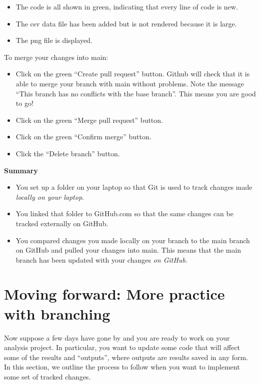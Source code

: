 \documentclass[
]{book}
\providecommand{\tightlist}{%
  \setlength{\itemsep}{0pt}\setlength{\parskip}{0pt}}
\begin{document}
\begin{itemize}
\tightlist
\item
  The code is all shown in green, indicating that every line of code is new.
\item
  The csv data file has been added but is not rendered because it is large.
\item
  The png file is displayed.
\end{itemize}

To merge your changes into main:

\begin{itemize}
\tightlist
\item
  Click on the green ``Create pull request'' button. Github will check that it
  is able to merge your branch with main without problems. Note the message ``This
  branch has no conflicts with the base branch''. This means you are good to go!
\item
  Click on the green ``Merge pull request'' button.\\
\item
  Click on the green ``Confirm merge'' button.
\item
  Click the ``Delete branch'' button.
\end{itemize}

\textbf{Summary}

\begin{itemize}
\tightlist
\item
  You set up a folder on your laptop so that Git is used to track changes made
  \emph{locally on your laptop}.
\item
  You linked that folder to GitHub.com so that the same changes can be tracked
  externally on GitHub.
\item
  You compared changes you made locally on your branch to the main branch on
  GitHub and pulled your changes into main. This means that the main branch has
  been updated with your changes \emph{on GitHub}.
\end{itemize}

\section{Moving forward: More practice with branching}\label{moving-forward-more-practice-with-branching}

Now suppose a few days have gone by and you are ready to work on your analysis
project. In particular, you want to update some code that will affect some
of the results and ``outputs'', where outputs are results saved in any form. In
this section, we outline the process to follow when you want to implement some
set of tracked changes.
\end{document}
